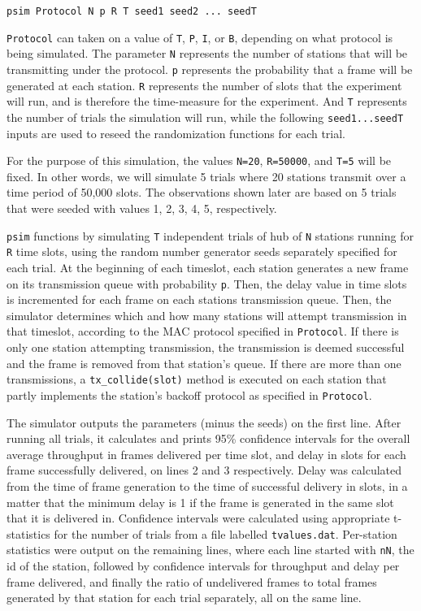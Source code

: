 \documentclass[twocolumn]{article}
\begin{document}
\begin{center}\verb|psim Protocol N p R T seed1 seed2 ... seedT|\end{center}

 \verb|Protocol| can taken on a value of \verb|T|, \verb|P|, \verb|I|, or \verb|B|, depending on
what protocol is being simulated. The parameter \verb|N| represents the number of
stations that will be transmitting under the protocol. \verb|p| represents the
probability that a frame will be generated at each station. \verb|R| represents the
number of slots that the experiment will run, and is therefore the time-measure
for the experiment. And \verb|T| represents the number of trials the simulation will
run, while the following \verb|seed1...seedT| inputs are used to reseed the
randomization functions for each trial. 

For the purpose of this simulation, the
values \verb|N=20|, \verb|R=50000|, and \verb|T=5| will be fixed. In other words, we will
simulate 5 trials where 20 stations transmit over a time period of 50,000 slots.
The observations shown later are based on 5 trials that were seeded with values
1, 2, 3, 4, 5, respectively.

\verb|psim| functions by simulating \verb|T| independent trials of hub of
\verb|N| stations running for \verb|R| time slots, using the random number
generator seeds separately specified for each trial. At the beginning of each
timeslot, each station generates a new frame on its transmission queue with
probability \verb|p|. Then, the delay value in time slots is incremented for
each frame on each stations transmission queue.  Then, the simulator determines
which and how many stations will attempt transmission in that timeslot,
according to the MAC protocol specified in \verb|Protocol|. If there is only one
station attempting transmission, the transmission is deemed successful and the
frame is removed from that station's queue. If there are more than one
transmissions, a \verb|tx_collide(slot)| method is executed on each station that
partly implements the station's backoff protocol as specified in
\verb|Protocol|.

The simulator outputs the parameters (minus the seeds) on the first line. After
running all trials, it calculates and prints 95\% confidence intervals for the
overall average throughput in frames delivered per time slot, and delay in slots
for each frame successfully delivered, on lines 2 and 3 respectively. Delay was 
calculated from the time of frame generation to the time of successful delivery in slots,
in a matter that the minimum delay is 1 if the frame is generated in the same slot that it is
delivered in. Confidence
intervals were calculated using appropriate t-statistics for the number of
trials from a file labelled \verb|tvalues.dat|. Per-station statistics were output
on the remaining lines, where each line started with \verb|nN|, the id of the station,
followed by confidence intervals for throughput and delay per frame delivered, and finally
the ratio of undelivered frames to total frames generated by that station for each trial 
separately, all on the same line.
\end{document}
